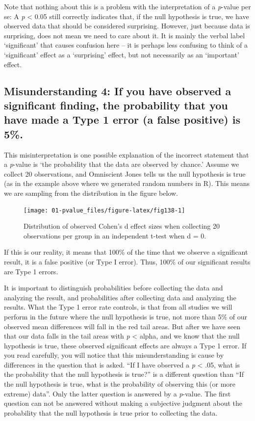 \documentclass[
  oneside]{book}
\begin{document}
Note that nothing about this is a problem with the interpretation of a \emph{p}-value per se: A \emph{p} \textless{} 0.05 still correctly indicates that, if the null hypothesis is true, we have observed data that should be considered surprising. However, just because data is surprising, does not mean we need to care about it. It is mainly the verbal label `significant' that causes confusion here -- it is perhaps less confusing to think of a `significant' effect as a `surprising' effect, but not necessarily as an `important' effect.

\hypertarget{misconception4}{%
\subsection{Misunderstanding 4: If you have observed a significant finding, the probability that you have made a Type 1 error (a false positive) is 5\%.}\label{misconception4}}

This misinterpretation is one possible explanation of the incorrect statement that a \emph{p}-value is `the probability that the data are observed by chance.' Assume we collect 20 observations, and Omniscient Jones tells us the null hypothesis is true (as in the example above where we generated random numbers in R). This means we are sampling from the distribution in the figure below.

\begin{figure}

{\centering \texttt{[image: 01-pvalue\_files/figure-latex/fig138-1]} 

}

\caption{Distribution of observed Cohen's d effect sizes when collecting 20 observations per group in an independent t-test when d = 0.}\label{fig:fig138}
\end{figure}

If this is our reality, it means that 100\% of the time that we observe a significant result, it is a false positive (or Type I error). Thus, 100\% of our significant results are Type 1 errors.

It is important to distinguish probabilities before collecting the data and analyzing the result, and probabilities after collecting data and analyzing the results. What the Type 1 error rate controls, is that from all studies we will perform in the future where the null hypothesis is true, not more than 5\% of our observed mean differences will fall in the red tail areas. But after we have seen that our data falls in the tail areas with \emph{p} \textless{} alpha, and we know that the null hypothesis is true, these observed significant effects are always a Type 1 error. If you read carefully, you will notice that this misunderstanding is cause by differences in the question that is asked. ``If I have observed a \emph{p} \textless{} .05, what is the probability that the null hypothesis is true?'' is a different question than ``If the null hypothesis is true, what is the probability of observing this (or more extreme) data''. Only the latter question is answered by a \emph{p}-value. The first question can not be answered without making a subjective judgment about the probability that the null hypothesis is true prior to collecting the data.
\end{document}
